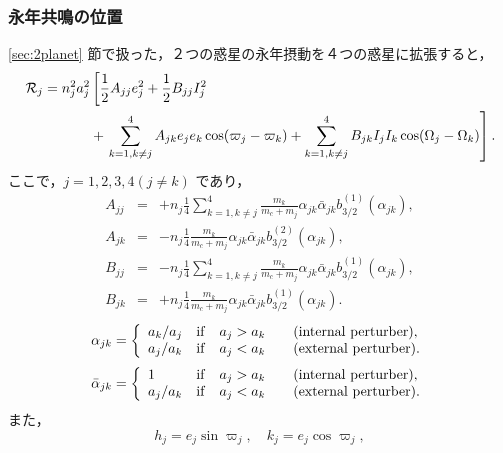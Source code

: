 \documentclass[11pt,a4paper,oneside,onecolumn]{jreport}
\begin{document}
\subsubsection{永年共鳴の位置}
\ref{sec:2planet} 節で扱った，２つの惑星の永年摂動を４つの惑星に拡張すると，
\begin{equation}
\begin{split}
{\cal R}_j = n_j^2 a_j^2 & \left[ \frac{1}{2} A_{jj} e_j^2 + \frac{1}{2} B_{jj} I_j^2 \right. \\
& + \left. \sum_{k = 1, k \not= j}^4 A_{jk} e_j e_k \cos (\varpi_j - \varpi_k) + \sum_{k = 1, k \not= j}^4 B_{jk} I_j I_k \cos (\Omega_j - \Omega_k) \right]. \\
\end{split} \label{}
\end{equation}
ここで，$j = 1, 2, 3, 4 (j \not= k)$ であり，
\begin{eqnarray}
A_{jj} & = & + n_j \frac{1}{4} \sum_{k = 1, k \not= j}^4 \frac{m_k}{m_c + m_j} \alpha_{jk} \bar{\alpha}_{jk} b_{3/2}^{(1)} (\alpha_{jk}), \\
A_{jk} & = & - n_j \frac{1}{4} \frac{m_k}{m_c + m_j} \alpha_{jk} \bar{\alpha}_{jk} b_{3/2}^{(2)} (\alpha_{jk}), \\
B_{jj} & = & - n_j \frac{1}{4} \sum_{k = 1, k \not= j}^4 \frac{m_k}{m_c + m_j} \alpha_{jk} \bar{\alpha}_{jk} b_{3/2}^{(1)} (\alpha_{jk}), \\
B_{jk} & = & + n_j \frac{1}{4} \frac{m_k}{m_c + m_j} \alpha_{jk} \bar{\alpha}_{jk} b_{3/2}^{(1)} (\alpha_{jk}). 
\end{eqnarray}
\begin{equation}
\alpha_{jk} = \left\{
\begin{array}{llll}
a_k / a_j & {\rm if} & a_j > a_k & \quad ({\rm internal \ perturber}), \\
a_j / a_k & {\rm if} & a_j < a_k & \quad ({\rm external \ perturber}).
\end{array}
\right.
\end{equation}
\begin{equation}
\bar{\alpha}_{jk} = \left\{
\begin{array}{llll}
1 & {\rm if} & a_j > a_k & \quad ({\rm internal \ perturber}), \\
a_j / a_k & {\rm if} & a_j < a_k & \quad ({\rm external \ perturber}).
\end{array}
\right.
\end{equation}
また，
\begin{equation}
h_j = e_j \sin \varpi_j, \quad k_j = e_j \cos \varpi_j,
\end{equation}
\end{document}
